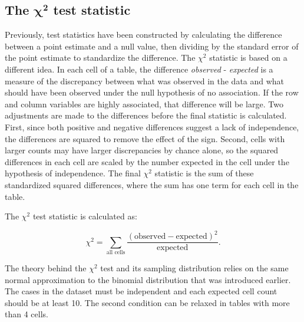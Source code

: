 

\textD{\newpage}


\subsection{The $\pmb{\chi^2}$ test statistic}

Previously, test statistics have been constructed by calculating the difference between a point estimate and a null value, then dividing by the standard error of the point estimate to standardize the difference. The $\chi^2$ statistic is based on a different idea.  In each cell of a table, the difference \emph{observed} - \emph{expected} is a measure of the discrepancy between what was observed in the data and what should have been observed under the null hypothesis of no association. If the row and column variables are highly associated, that difference will be large.  Two adjustments are made to the differences before the final statistic is calculated.  First, since both positive and negative differences suggest a lack of independence, the differences are squared to remove the effect of the sign.  Second, cells with larger counts may have larger discrepancies by chance alone, so the squared differences in each cell are scaled by the number expected in the cell under the hypothesis of independence.  The final $\chi^2$ statistic is the sum of these standardized squared differences, where the sum has one term for each cell in the table.

The $\chi^2$ test statistic is calculated as:

\[\chi^2 = \sum_{\text{all cells}} \frac{(\text{observed} - \text{expected})^2}{\text{expected}}. \]

The theory behind the $\chi^2$ test and its sampling distribution relies on the same normal approximation to the binomial distribution that was introduced earlier.  The cases in the dataset must be independent and each expected cell count should be at least 10.  The second condition can be relaxed in tables with more than 4 cells.

